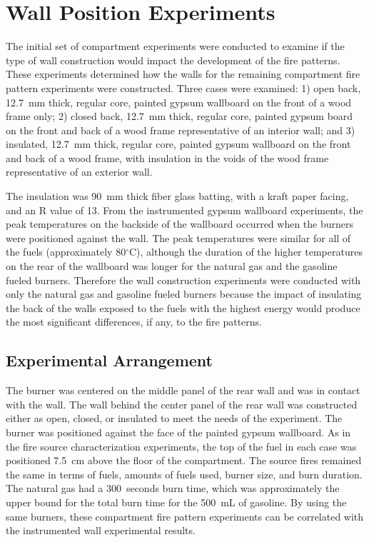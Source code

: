 \documentclass[twoside]{uocthesis}
\begin{document}
{\section{Wall Position Experiments}

 The initial set of compartment experiments were conducted to examine if the type of wall construction would impact the development of the fire patterns. These experiments determined how the walls for the remaining compartment fire pattern experiments were constructed.  Three cases were examined: 1) open back, 12.7~mm thick, regular core, painted gypsum wallboard on the front of a wood frame only; 2) closed back, 12.7~mm thick, regular core, painted gypsum board on the front and back of a wood frame representative of an interior wall; and 3) insulated, 12.7~mm thick, regular core, painted gypsum wallboard on the front and back of a wood frame, with insulation in the voids of the wood frame representative of an exterior wall. 

 The insulation was 90~mm thick fiber glass batting, with a kraft paper facing, and an R value of 13.  From the instrumented gypsum wallboard experiments, the peak temperatures on the backside of the wallboard occurred when the burners were positioned against the wall.  The peak temperatures were similar for all of the fuels (approximately 80$^\circ$C), although the duration of the higher temperatures on the rear of the wallboard was longer for the natural gas and the gasoline fueled burners. Therefore the wall construction experiments were conducted with only the natural gas and gasoline fueled burners because the impact of insulating the back of the walls exposed to the fuels with the highest energy would produce the most significant differences, if any, to the fire patterns.


\subsection{Experimental Arrangement}

The burner was centered on the middle panel of the rear wall and was in contact with the wall. The wall behind the center panel of the rear wall was constructed either as open, closed, or insulated to meet the needs of the experiment. The burner was positioned against the face of the painted gypsum wallboard. As in the fire source characterization experiments, the top of the fuel in each case was positioned 7.5~cm above the floor of the compartment. The source fires remained the same in terms of fuels, amounts of fuels used, burner size, and burn duration.  The natural gas had a 300~seconds burn time, which was approximately the upper bound for the total burn time for the 500~mL of gasoline.  By using the same burners, these compartment fire pattern experiments can be correlated with the instrumented wall experimental results.

}
\end{document}
